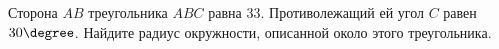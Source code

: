 \begin{ex}
	\begin{condition}
		Сторона \( AB  \) треугольника \( ABC  \) равна \(  33 \). Противолежащий ей угол \( C  \) равен \( 30  \degree\). Найдите радиус окружности, описанной около этого треугольника.
	\end{condition}
\end{ex}